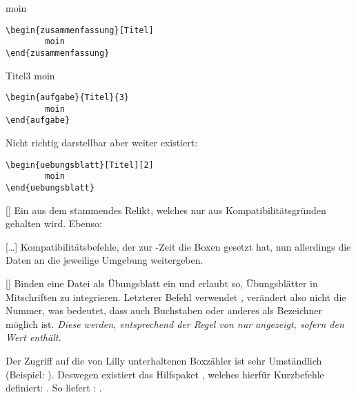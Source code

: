 \begingroup\begin{zusammenfassung}[Titel]
moin
\begin{lstlisting}[language=lLatex]
\begin{zusammenfassung}[Titel]
        moin
\end{zusammenfassung}\end{lstlisting}
\end{zusammenfassung}\endgroup

\begingroup\begin{aufgabe}{Titel}{3}
moin
\begin{lstlisting}[language=lLatex]
\begin{aufgabe}{Titel}{3}
        moin
\end{aufgabe}\end{lstlisting}
\end{aufgabe}\endgroup

Nicht richtig darstellbar aber weiter existiert:
\begin{lstlisting}[language=lLatex]
\begin{uebungsblatt}[Titel][2]
        moin
\end{uebungsblatt}\end{lstlisting}

[\cmdold]
Ein aus dem  stammendes Relikt, welches nur aus Kompatibilitätsgründen gehalten wird. Ebenso:

[\cmdlist {}\cmdlist \ldots\cmdold]
Kompatibilitätsbefehle, der zur -Zeit die Boxen gesetzt hat, nun allerdings die Daten an die jeweilige Umgebung weitergeben.

[\cmdlist {}]
Binden eine Datei als Übungsblatt ein und erlaubt so, Übungsblätter in Mitschriften zu integrieren. Letzterer Befehl verwendet , verändert also nicht die Nummer, was bedeutet, dass auch Buchstaben oder anderes als Bezeichner möglich ist. \emph{Diese werden, entsprechend der Regel von  nur angezeigt, sofern  den Wert \T{\true} enthält.}


\begin{bemerkung}
    Der Zugriff auf die von Lilly unterhaltenen Boxzähler ist sehr Umständlich (Beispiel: ). Deswegen existiert das Hilfspaket , welches hierfür Kurzbefehle definiert: . So liefert : \T{\arabic{\CTRxDEF}}.
\end{bemerkung}

